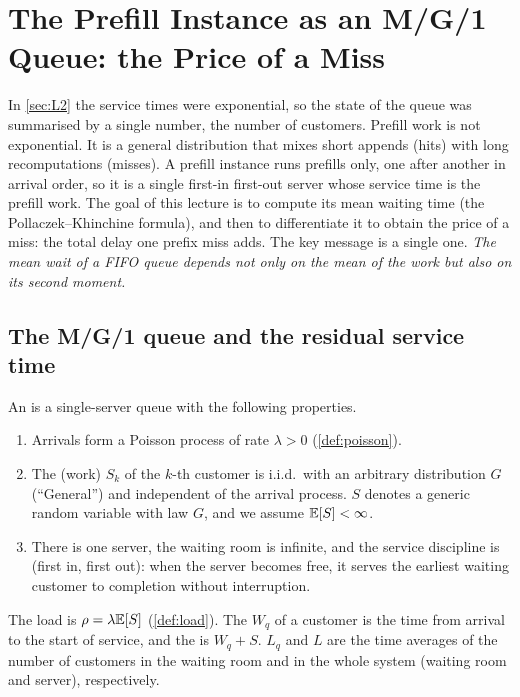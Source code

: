 \chapter{The Prefill Instance as an M/G/1 Queue: the Price of a Miss}\label{sec:L3}

In \cref{sec:L2} the service times were exponential, so the state of the queue
was summarised by a single number, the number of customers. Prefill work is not
exponential. It is a general distribution that mixes short appends (hits) with
long recomputations (misses). A prefill instance runs prefills only, one after
another in arrival order, so it is a single first-in first-out server whose
service time is the prefill work. The goal of this lecture is to compute its mean
waiting time (the Pollaczek--Khinchine formula), and then to differentiate it to
obtain the price of a miss: the total delay one prefix miss adds. The key message
is a single one.
\emph{The mean wait of a FIFO queue depends not only on the mean of the work but
also on its second moment.}

\section{The M/G/1 queue and the residual service time}

\begin{definition}\label{L3:def:mg1}
An  is a single-server queue with the following properties.
\begin{enumerate}[label=(\alph*)]
\item Arrivals form a Poisson process of rate $\lambda>0$ (\cref{def:poisson}).
\item The  (work) $S_k$ of the $k$-th customer is i.i.d.\ with
  an arbitrary distribution $G$ (``General'') and independent of the arrival
  process. $S$ denotes a generic random variable with law $G$, and we assume
  $\mathbb{E}[S]<\infty$.
\item There is one server, the waiting room is infinite, and the service
  discipline is  (first in, first out): when the server becomes free,
  it serves the earliest waiting customer to completion without interruption.
\end{enumerate}
The load is $\rho=\lambda\mathbb{E}[S]$ (\cref{def:load}). The  $W_q$ of a customer is the time from arrival to the start of service, and
the  is $W_q+S$. $L_q$ and $L$ are the time averages of the
number of customers in the waiting room and in the whole system (waiting room
and server), respectively.
\end{definition}

